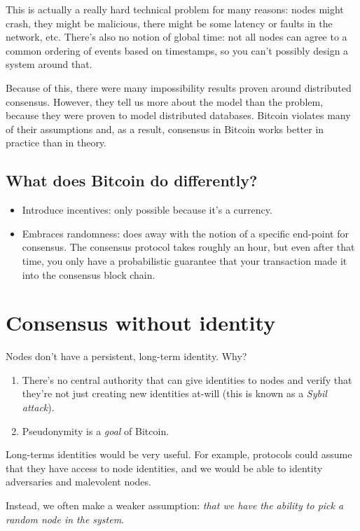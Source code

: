 \documentclass[12pt]{article}
\begin{document}
This is actually a really hard technical problem for many reasons: nodes might crash, they might be malicious, there might be some latency or faults in the network, etc. There's also no notion of global time: not all nodes can agree to a common ordering of events based on timestamps, so you can't possibly design a system around that.

Because of this, there were many impossibility results proven around distributed consensus. However, they tell us more about the model than the problem, because they were proven to model distributed databases. Bitcoin violates many of their assumptions and, as a result, consensus in Bitcoin works better in practice than in theory.

\subsection*{What does Bitcoin do differently?}
\begin{itemize}
\item Introduce incentives: only possible because it's a currency.
\item Embraces randomness: does away with the notion of a specific end-point for consensus. The consensus protocol takes roughly an hour, but even after that time, you only have a probabilistic guarantee that your transaction made it into the consensus block chain.
\end{itemize}

\section*{Consensus without identity}

Nodes don't have a persistent, long-term identity. Why?

\begin{enumerate}
\item There's no central authority that can give identities to nodes and verify that they're not just creating new identities at-will (this is known as a \textit{Sybil attack}).
\item Pseudonymity is a \textit{goal} of Bitcoin.
\end{enumerate}

Long-terms identities would be very useful. For example, protocols could assume that they have access to node identities, and we would be able to identity adversaries and malevolent nodes.

Instead, we often make a weaker assumption: \textit{that we have the ability to pick a random node in the system}.
\end{document}

